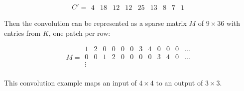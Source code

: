 $$
C' =
\begin{matrix}
  4 & 18 & 12 & 12 & 25 & 13 & 8 & 7 & 1
\end{matrix}
$$

Then the convolution can be represented as a sparse matrix $M$ of $9\times36$ with entries from $K$, one patch
per row:

$$
M =
\begin{matrix}
  1 & 2 & 0 & 0 & 0 & 0 & 3 & 4 & 0 & 0 & 0 & \dots \\
  0 & 0 & 1 & 2 & 0 & 0 & 0 & 0 & 3 & 4 & 0 & \dots \\
  \vdots \\
\end{matrix}
$$

This convolution example maps an input of $4 \times 4$ to an output of $3 \times 3$. 

\clearpage %
